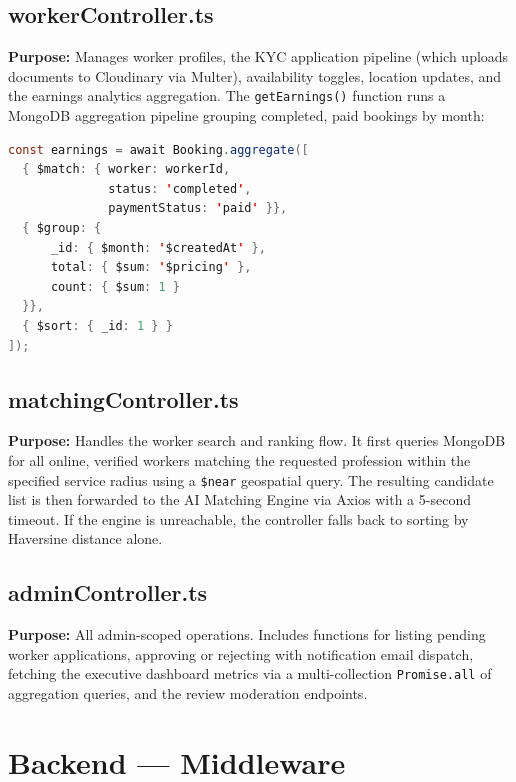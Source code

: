 \documentclass[12pt,a4paper]{report}
\begin{document}
\subsection{workerController.ts}

\textbf{Purpose:} Manages worker profiles, the KYC application pipeline (which uploads documents to Cloudinary via Multer), availability toggles, location updates, and the earnings analytics aggregation. The \texttt{getEarnings()} function runs a MongoDB aggregation pipeline grouping completed, paid bookings by month:

\begin{lstlisting}[language=Java,caption={Earnings aggregation pipeline}]
const earnings = await Booking.aggregate([
  { $match: { worker: workerId,
              status: 'completed',
              paymentStatus: 'paid' }},
  { $group: {
      _id: { $month: '$createdAt' },
      total: { $sum: '$pricing' },
      count: { $sum: 1 }
  }},
  { $sort: { _id: 1 } }
]);
\end{lstlisting}

\subsection{matchingController.ts}

\textbf{Purpose:} Handles the worker search and ranking flow. It first queries MongoDB for all online, verified workers matching the requested profession within the specified service radius using a \texttt{\$near} geospatial query. The resulting candidate list is then forwarded to the AI Matching Engine via Axios with a 5-second timeout. If the engine is unreachable, the controller falls back to sorting by Haversine distance alone.

\subsection{adminController.ts}

\textbf{Purpose:} All admin-scoped operations. Includes functions for listing pending worker applications, approving or rejecting with notification email dispatch, fetching the executive dashboard metrics via a multi-collection \texttt{Promise.all} of aggregation queries, and the review moderation endpoints.

\section{Backend — Middleware}
\end{document}
